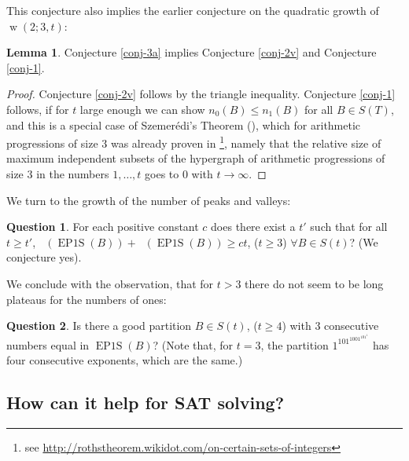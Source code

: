 \documentclass[final,3p,times]{elsarticle}
\theoremstyle{definition}
\newtheorem{ques}{Question}[section]
\newtheorem{lem}{Lemma}[section]
\DeclareMathOperator{\epos}{EP1S}
\DeclareMathOperator{\np}{\mathit{n}_p}
\DeclareMathOperator{\nv}{\mathit{n}_v}
\DeclareMathOperator{\vdw}{w}
\begin{document}
This conjecture also implies the earlier conjecture on the quadratic growth of $\vdw(2;3,t)$:
\begin{lem}\label{lem:relconj}
  Conjecture \ref{conj-3a} implies Conjecture \ref{conj-2v} and Conjecture \ref{conj-1}.
\end{lem}
\begin{proof}
Conjecture \ref{conj-2v} follows by the triangle inequality. Conjecture \ref{conj-1} follows, if for $t$ large enough we can show $n_0(B) \le n_1(B)$ for all $B \in S(T)$, and this is a special case of Szemer\'edi's Theorem (\cite{Szemeredi1975AP}), which for arithmetic progressions of size $3$ was already proven in \cite{Roth1953vdW}\footnote{see \url{http://rothstheorem.wikidot.com/on-certain-sets-of-integers}}, namely that the relative size of maximum independent subsets of the hypergraph of arithmetic progressions of size $3$ in the numbers $1,\dots,t$ goes to $0$ with $t \rightarrow \infty$.
\end{proof}

We turn to the growth of the number of peaks and valleys:
\begin{ques}\label{ques-4}
For each positive constant $c$ does there exist a $t'$ such that for all $t\geq t'$,
$\np(\epos(B))+\nv(\epos(B)) \geq ct$, ($t\geq 3$) $\forall{B}\in S(t)$? (We conjecture yes).
\end{ques}

We conclude with the observation, that for $t > 3$ there do not seem to be long plateaus for the numbers of ones:
\begin{ques}\label{ques-5}
Is there a good partition $B\in S(t)$, ($t\geq 4$) with 3 consecutive
numbers equal in $\epos(B)$? (Note that, for $t=3$, the partition $1^101^1001^101^1$
has four consecutive exponents, which are the same.)
\end{ques}


\subsection{How can it help for SAT solving?}
\label{sec:canhelp}
\end{document}
